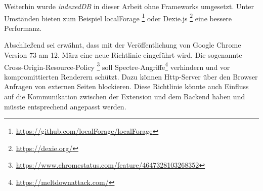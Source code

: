 Weiterhin wurde \textit{indexedDB} in dieser Arbeit ohne Frameworks umgesetzt. Unter Umständen bieten zum Beispiel \glqq localForage \grqq{}\footnote{\url{https://github.com/localForage/localForage}} oder \glqq Dexie.js \grqq{}\footnote{\url{https://dexie.org/}} eine bessere Performanz.

Abschließend sei erwähnt, dass mit der Veröffentlichung von Google Chrome Version 73 am 12. März eine neue Richtlinie eingeführt wird. Die sogenannte \glqq Cross-Origin-Resource-Policy \grqq{}\footnote{\url{https://www.chromestatus.com/feature/4647328103268352}} soll \glqq Spectre\grqq{}-Angriffe\footnote{\url{https://meltdownattack.com/}} verhindern und vor kompromittierten Renderern schützt. Dazu können Http-Server über den Browser Anfragen von externen Seiten blockieren. Diese Richtlinie könnte auch Einfluss auf die Kommunikation zwischen der Extension und dem Backend haben und müsste entsprechend angepasst werden.













